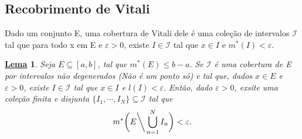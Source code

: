 \documentclass{article}
\newtheorem*{lemma*}{\underline{Lema}}
\begin{document}
\subsection{Recobrimento de Vitali}
  Dado um conjunto E, uma cobertura de Vitali dele é uma cole\c cão de intervalos
  \(\mathcal{I}\) tal que para todo x em E e \(\varepsilon  > 0\), existe \(I\in \mathcal{I}\) tal que
  \(x\in I\) e \(m^{*}(I) < \varepsilon .\) 
\begin{lemma*}
  Seja \(E\subseteq{[a, b]}\), tal que \(m^{*}(E)\leq b-a.\) Se \(\mathcal{I}\)
  é uma cobertura de E por intervalos não degenerados (Não é um ponto só) e tal que, dados \(x\in E\) e
  \(\varepsilon >0\), existe \(I\in \mathcal{I}\) tal que \(x\in I\) e \(l(I) < \varepsilon .\)
  Então, dado \(\varepsilon  > 0\), exsite uma cole\c cão finita e disjunta \(\{I_{1}, \cdots, I_{N}\}\subseteq{\mathcal{I}}\)
  tal que 
    \[
      m^{*}\biggl(E\biggl\backslash\biggr. \bigcup_{n=1}^{N}{I_{n}}\biggr) < \varepsilon .
    \]
\end{lemma*}
\end{document}
